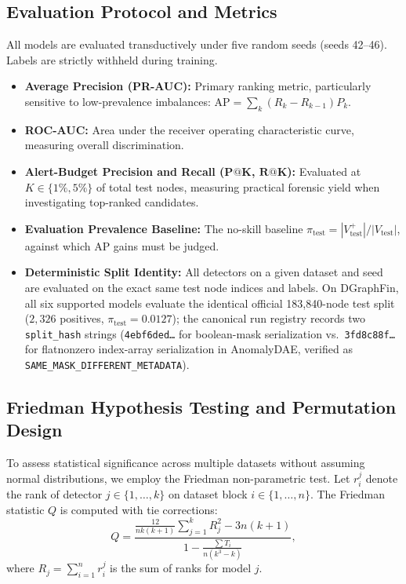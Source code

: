 \documentclass[applsci,article,submit,moreauthors,pdftex]{Definitions/mdpi}
\begin{document}
\subsection{Evaluation Protocol and Metrics}
All models are evaluated transductively under five random seeds (seeds 42--46). Labels are strictly withheld during training.
\begin{itemize}
    \item \textbf{Average Precision (PR-AUC):} Primary ranking metric, particularly sensitive to low-prevalence imbalances: $\mathrm{AP} = \sum_k (R_k - R_{k-1}) P_k$.
    \item \textbf{ROC-AUC:} Area under the receiver operating characteristic curve, measuring overall discrimination.
    \item \textbf{Alert-Budget Precision and Recall ($\mathbf{P@K}$, $\mathbf{R@K}$):} Evaluated at $K \in \{1\%, 5\%\}$ of total test nodes, measuring practical forensic yield when investigating top-ranked candidates.
    \item \textbf{Evaluation Prevalence Baseline:} The no-skill baseline $\pi_{\mathrm{test}} = |V_{\mathrm{test}}^+| / |V_{\mathrm{test}}|$, against which AP gains must be judged.
    \item \textbf{Deterministic Split Identity:} All detectors on a given dataset and seed are evaluated on the exact same test node indices and labels. On DGraphFin, all six supported models evaluate the identical official 183,840-node test split ($2{,}326$ positives, $\pi_{\mathrm{test}} = 0.0127$); the canonical run registry records two \texttt{split\_hash} strings (\texttt{4ebf6ded\dots} for boolean-mask serialization vs.\ \texttt{3fd8c88f\dots} for flatnonzero index-array serialization in AnomalyDAE, verified as \texttt{SAME\_MASK\_DIFFERENT\_METADATA}).
\end{itemize}

\subsection{Friedman Hypothesis Testing and Permutation Design}
To assess statistical significance across multiple datasets without assuming normal distributions, we employ the Friedman non-parametric test. Let $r_i^j$ denote the rank of detector $j \in \{1, \dots, k\}$ on dataset block $i \in \{1, \dots, n\}$. The Friedman statistic $Q$ is computed with tie corrections:
\begin{equation}
Q = \frac{\frac{12}{n k (k+1)} \sum_{j=1}^k R_j^2 - 3 n (k+1)}{1 - \frac{\sum T_i}{n(k^3 - k)}},
\label{eq:friedman_q}
\end{equation}
where $R_j = \sum_{i=1}^n r_i^j$ is the sum of ranks for model $j$. 
\end{document}
